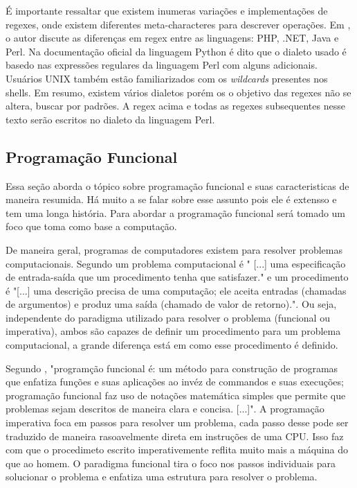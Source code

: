 É importante ressaltar que existem inumeras variações e implementações de regexes, onde existem diferentes meta-characteres para descrever operações.
Em \cite{mastering}, o autor discute as diferenças em regex entre as linguagens: PHP, .NET, Java e Perl.
Na documentação oficial da linguagem Python \cite{python-re} é dito que o dialeto usado é basedo nas expressões regulares da linguagem Perl com alguns adicionais.
Usuários UNIX também estão familiarizados com os \emph{wildcards} presentes nos shells.
Em resumo, existem vários dialetos porém os o objetivo das regexes não se altera, buscar por padrões.
A regex acima e todas as regexes subsequentes nesse texto serão escritos no dialeto da linguagem Perl. 

\subsection{Programação Funcional}

Essa seção aborda o tópico sobre programação funcional e suas caracteristicas de maneira resumida.
Há muito a se falar sobre esse assunto pois ele é extensso e tem uma longa história.
Para abordar a programação funcional será tomado um foco que toma como base a computação.

De maneira geral, programas de computadores existem para resolver problemas computacionais.
Segundo \cite{matrix} um problema computacional é
" [...] uma especificação de entrada-saída que um procedimento tenha que satisfazer."
e um procedimento é
"[...] uma descrição precisa de uma computação; ele aceita entradas (chamadas de argumentos) e produz uma saída (chamado de valor de retorno).".
Ou seja, independente do paradigma utilizado para resolver o problema (funcional ou imperativa), ambos são capazes de definir um procedimento para um problema computacional, a grande diferença está em como esse procedimento é definido.

Segundo \cite{Bird},
"programção funcional é: um método para construção de programas que enfatiza funções e suas aplicações ao invéz de commandos e suas execuções; programação funcional faz uso de notações matemática simples que permite que problemas sejam descritos de maneira clara e concisa. [...]".
A programação imperativa foca em passos para resolver um problema, cada passo desse pode ser traduzido de maneira rasoavelmente direta em instruções de uma CPU.
Isso faz com que o procedimeto escrito imperativemente reflita muito mais a máquina do que ao homem.
O paradigma funcional tira o foco nos passos individuais para solucionar o problema e enfatiza uma estrutura para resolver o problema.

